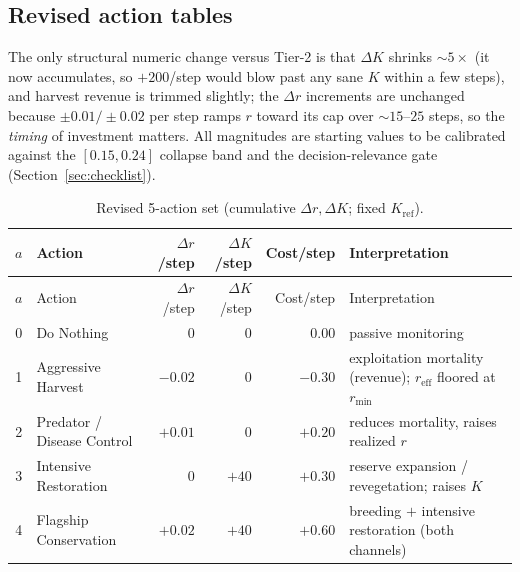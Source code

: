 \documentclass[11pt]{article}
\newcommand{\reff}{r_{\mathrm{eff}}}
\newcommand{\Kref}{K_{\mathrm{ref}}}
\newcommand{\rmin}{r_{\min}}
\begin{document}
\subsection{Revised action tables}
The only structural numeric change versus Tier-2 is that $\Delta K$ shrinks
$\sim\!5\times$ (it now accumulates, so $+200$/step would blow past any sane $K$
within a few steps), and harvest revenue is trimmed slightly; the $\Delta r$
increments are unchanged because $\pm0.01/\pm0.02$ per step ramps $r$ toward its
cap over $\sim\!15$--$25$ steps, so the \emph{timing} of investment matters. All
magnitudes are starting values to be calibrated against the $[0.15,0.24]$ collapse
band and the decision-relevance gate (Section~\ref{sec:checklist}).

\begin{longtable}{@{}c p{3.0cm} r r r p{4.6cm}@{}}
\caption{Revised 5-action set (cumulative $\Delta r,\Delta K$; fixed $\Kref$).}\\
\toprule
$a$ & Action & $\Delta r$/step & $\Delta K$/step & Cost/step & Interpretation \\
\midrule
\endfirsthead
\toprule
$a$ & Action & $\Delta r$/step & $\Delta K$/step & Cost/step & Interpretation \\
\midrule
\endhead
0 & Do Nothing & $0$ & $0$ & $0.00$ & passive monitoring \\
1 & Aggressive Harvest & $-0.02$ & $0$ & $-0.30$ & exploitation mortality (revenue); $\reff$ floored at $\rmin$ \\
2 & Predator / Disease Control & $+0.01$ & $0$ & $+0.20$ & reduces mortality, raises realized $r$ \\
3 & Intensive Restoration & $0$ & $+40$ & $+0.30$ & reserve expansion / revegetation; raises $K$ \\
4 & Flagship Conservation & $+0.02$ & $+40$ & $+0.60$ & breeding $+$ intensive restoration (both channels) \\
\bottomrule
\end{longtable}
\end{document}
